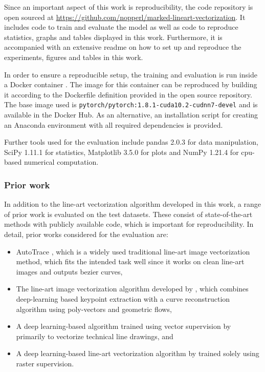 Since an important aspect of this work is reproducibility, the code repository is open sourced at \url{https://github.com/nopperl/marked-lineart-vectorization}. It includes code to train and evaluate the model as well as code to reproduce statistics, graphs and tables displayed in this work. Furthermore, it is accompanied with an extensive readme on how to set up and reproduce the experiments, figures and tables in this work.

In order to ensure a reproducible setup, the training and evaluation is run inside a Docker container \citep{10.5555/2600239.2600241}. The image for this container can be reproduced by building it according to the Dockerfile definition provided in the open source repository. The base image used is \texttt{pytorch/pytorch:1.8.1-cuda10.2-cudnn7-devel} and is available in the Docker Hub. As an alternative, an installation script for creating an Anaconda \citep{anaconda} environment with all required dependencies is provided.

Further tools used for the evaluation include pandas 2.0.3 \citep{pandas} for data manipulation, SciPy 1.11.1 \citep{scipy} for statistics, Matplotlib 3.5.0 \citep{matplotlib} for plots and NumPy 1.21.4 \citep{numpy} for \gls{cpu}-based numerical computation.

\subsubsection{Prior work}
\label{subsec:eval.setup.prior}

In addition to the line-art vectorization algorithm developed in this work, a range of prior work is evaluated on the test datasets. These consist of state-of-the-art methods with publicly available code, which is important for reproducibility. In detail, prior works considered for the evaluation are:

\begin{itemize}
    \item AutoTrace \citep{autotrace}, which is a widely used traditional line-art image vectorization method, which fits the intended task well since it works on clean line-art images and outputs bezier curves,
    \item The line-art image vectorization algorithm developed by \citet{Puhachov2021KeypointPolyvector}, which combines deep-learning based keypoint extraction with a curve reconstruction algorithm using poly-vectors and geometric flows,
    \item A deep learning-based algorithm trained using vector supervision by \citet{DBLP:conf/eccv/EgiazarianVAVST20} primarily to vectorize technical line drawings, and
    \item A deep learning-based line-art vectorization algorithm by \citet{mo2021virtualsketching} trained solely using raster supervision.
\end{itemize}

